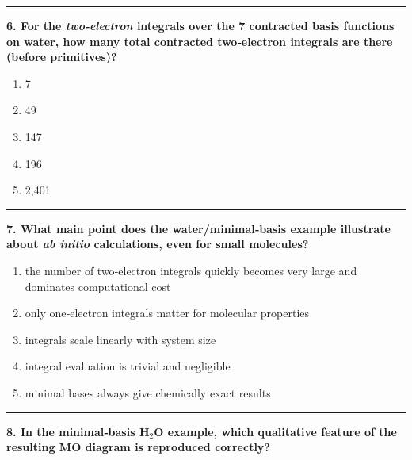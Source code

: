 \documentclass[
  english,
  9pt,
]{extbook}
\providecommand{\tightlist}{%
  \setlength{\itemsep}{0pt}\setlength{\parskip}{0pt}}
\theoremstyle{definition}
\theoremstyle{definition}
\theoremstyle{definition}
\theoremstyle{definition}
\theoremstyle{remark}
\begin{document}
\begin{center}\rule{0.5\linewidth}{0.5pt}\end{center}

\textbf{6. For the \emph{two‑electron} integrals over the 7 contracted basis functions on water, how many total contracted two‑electron integrals are there (before primitives)?}

\begin{enumerate}
\def\labelenumi{\alph{enumi}.}
\tightlist
\item
  7\\
\item
  49\\
\item
  147\\
\item
  196\\
\item
  2,401
\end{enumerate}

\begin{center}\rule{0.5\linewidth}{0.5pt}\end{center}

\textbf{7. What main point does the water/minimal‑basis example illustrate about \emph{ab initio} calculations, even for small molecules?}

\begin{enumerate}
\def\labelenumi{\alph{enumi}.}
\tightlist
\item
  the number of two‑electron integrals quickly becomes very large and dominates computational cost\\
\item
  only one‑electron integrals matter for molecular properties\\
\item
  integrals scale linearly with system size\\
\item
  integral evaluation is trivial and negligible\\
\item
  minimal bases always give chemically exact results
\end{enumerate}

\begin{center}\rule{0.5\linewidth}{0.5pt}\end{center}

\textbf{8. In the minimal‑basis H\(_2\)O example, which qualitative feature of the resulting MO diagram is reproduced correctly?}
\end{document}
